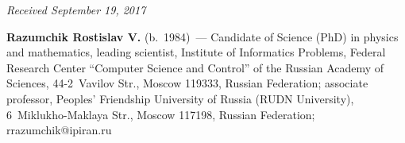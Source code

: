 \vspace*{-6pt}

\hfill{\small\textit{Received September 19, 2017}}


\Contrl

\noindent
\textbf{Razumchik Rostislav V.} (b.\ 1984)~--- 
Candidate of Science (PhD) in physics and mathematics, leading scientist, 
Institute of Informatics Problems, Federal Research Center 
``Computer Science and Control'' of the Russian Academy of Sciences, 
44-2~Vavilov Str., Moscow 119333, Russian Federation; 
associate professor, Peoples' Friendship University of Russia (RUDN University), 
6~Miklukho-Maklaya Str., Moscow 117198, Russian Federation; 
\mbox{rrazumchik@ipiran.ru}
\label{end\stat}


\renewcommand{\bibname}{\protect\rm Литература} 